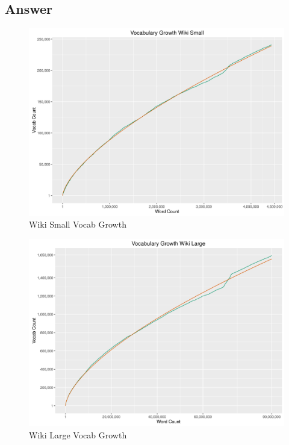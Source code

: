 \documentclass[11pt]{article}
\begin{document}
\subsection{Answer}
\begin{figure}[h]
\includegraphics[width=\columnwidth]{code/wikiSmallVG.png}
\caption{Wiki Small Vocab Growth}
\label{fig:wsvg}
\end{figure}
\begin{figure}[h]
\includegraphics[width=\columnwidth]{code/wikiLargeVG.png}
\caption{Wiki Large Vocab Growth}
\label{fig:wsvg}
\end{figure}
\end{document}
